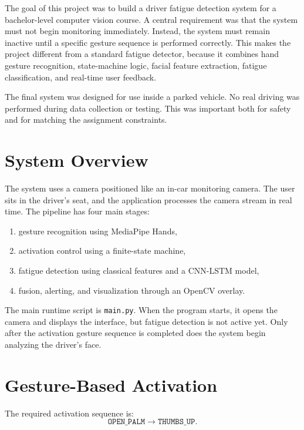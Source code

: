 \documentclass[conference]{IEEEtran}
\begin{document}
The goal of this project was to build a driver fatigue detection system for a bachelor-level computer vision course. A central requirement was that the system must not begin monitoring immediately. Instead, the system must remain inactive until a specific gesture sequence is performed correctly. This makes the project different from a standard fatigue detector, because it combines hand gesture recognition, state-machine logic, facial feature extraction, fatigue classification, and real-time user feedback.

The final system was designed for use inside a parked vehicle. No real driving was performed during data collection or testing. This was important both for safety and for matching the assignment constraints.

\section{System Overview}

The system uses a camera positioned like an in-car monitoring camera. The user sits in the driver's seat, and the application processes the camera stream in real time. The pipeline has four main stages:

\begin{enumerate}
    \item gesture recognition using MediaPipe Hands,
    \item activation control using a finite-state machine,
    \item fatigue detection using classical features and a CNN-LSTM model,
    \item fusion, alerting, and visualization through an OpenCV overlay.
\end{enumerate}

The main runtime script is \texttt{main.py}. When the program starts, it opens the camera and displays the interface, but fatigue detection is not active yet. Only after the activation gesture sequence is completed does the system begin analyzing the driver's face.

\section{Gesture-Based Activation}

The required activation sequence is:
\begin{equation*}
\texttt{OPEN\_PALM} \rightarrow \texttt{THUMBS\_UP}.
\end{equation*}
\end{document}
